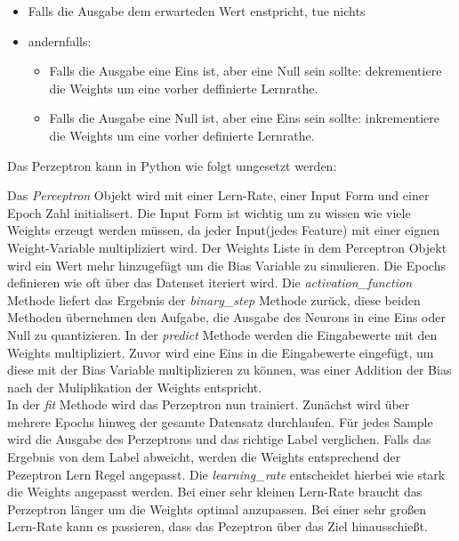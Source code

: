 \documentclass[conference, german]{IEEEtran}
\begin{document}
\begin{itemize}
	\item Falls die Ausgabe dem erwarteden Wert enstpricht, tue nichts
	\item andernfalls:
	\begin{itemize}
		\item Falls die Ausgabe eine Eins ist, aber eine Null sein sollte:
		dekrementiere die Weights um eine vorher deffinierte Lernrathe.
		\item Falls die Ausgabe eine Null ist, aber eine Eins sein sollte:
		inkrementiere die Weights um eine vorher definierte Lernrathe.
	\end{itemize}
\end{itemize}

Das Perzeptron kann in Python wie folgt umgesetzt werden:



Das \textit{Perceptron} Objekt wird mit einer Lern-Rate, einer Input Form und einer Epoch Zahl initialisert. Die Input Form ist wichtig um zu wissen wie viele Weights erzeugt werden müssen, da jeder Input(jedes Feature) mit einer eignen Weight-Variable multipliziert wird. Der Weights Liste in dem Perceptron Objekt wird ein Wert mehr hinzugefügt um die Bias Variable zu simulieren. Die Epochs definieren wie oft über das Datenset iteriert wird. Die \textit{activation\_function} Methode liefert das Ergebnis der \textit{binary\_step} Methode zurück, diese beiden Methoden übernehmen den Aufgabe, die Ausgabe des Neurons in eine Eins oder Null zu quantizieren. 
In der \textit{predict} Methode werden die Eingabewerte mit den Weights multipliziert. Zuvor wird eine Eins in die Eingabewerte eingefügt, um diese mit der Bias Variable multiplizieren zu können, was einer Addition der Bias nach der Muliplikation der Weights entspricht. \\

In der \textit{fit} Methode wird das Perzeptron nun trainiert. 
Zunächst wird über mehrere Epochs hinweg der gesamte Datensatz durchlaufen.
Für jedes Sample wird die Ausgabe des Perzeptrons und das richtige Label verglichen. Falls das Ergebnis von dem Label abweicht, werden die Weights entsprechend der Pezeptron Lern Regel angepasst. Die \textit{learning\_rate} entscheidet hierbei wie stark die Weights angepasst werden. 
Bei einer sehr kleinen Lern-Rate braucht das Perzeptron länger um die Weights optimal anzupassen. Bei einer sehr großen Lern-Rate kann es passieren, dass das Pezeptron über das Ziel hinausschießt. 
\end{document}
